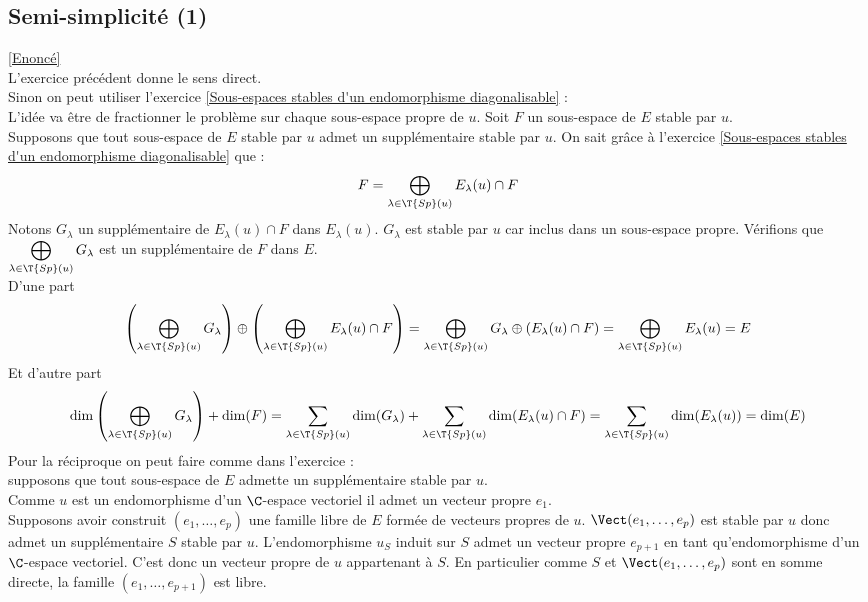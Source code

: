 \documentclass[8pt]{book}
\begin{document}
	\subsection{Semi-simplicité (1) }
	\label{Semi-simplicité (1) corrigé}
	\textcolor{blue}{\hyperref[Semi-simplicité (1)]{[Enoncé]}}\\
	L'exercice précédent donne le sens direct.\\
	Sinon on peut utiliser l'exercice \ref{Sous-espaces stables d'un endomorphisme diagonalisable} :\\
	L'idée va être de fractionner le problème sur chaque sous-espace propre de $u$. Soit $F$ un sous-espace de $E$ stable par $u$.\\
	Supposons que tout sous-espace de $E$ stable par $u$ admet un supplémentaire stable par $u$. On sait grâce à l'exercice \ref{Sous-espaces stables d'un endomorphisme diagonalisable} que :
	$$F=\bigoplus_{\lambda\in \T{Sp}(u)}E_\lambda(u)\cap F$$
	Notons $G_\lambda$ un supplémentaire de $E_\lambda(u)\cap F$ dans $E_\lambda(u)$. $G_\lambda$ est stable par $u$ car inclus dans un sous-espace propre. Vérifions que $\displaystyle\bigoplus_{\lambda\in \T{Sp}(u)}G_\lambda$ est un supplémentaire de $F$ dans $E$.\\
	D'une part $$\left(\bigoplus_{\lambda\in \T{Sp}(u)}G_\lambda\right)\oplus\left(\bigoplus_{\lambda\in \T{Sp}(u)}E_\lambda(u)\cap F\right)=\bigoplus_{\lambda\in \T{Sp}(u)}G_\lambda\oplus(E_\lambda(u)\cap F)=\bigoplus_{\lambda\in \T{Sp}(u)}E_\lambda(u)=E$$
	Et d'autre part $$\dim\left(\bigoplus_{\lambda\in \T{Sp}(u)}G_\lambda\right)+\dim(F)=\sum_{\lambda\in \T{Sp}(u)}\dim(G_\lambda)+\sum_{\lambda\in \T{Sp}(u)}\dim(E_\lambda(u)\cap F)=\sum_{\lambda\in \T{Sp}(u)}\dim(E_\lambda(u))=\dim(E)$$
	Pour la réciproque on peut faire comme dans l'exercice :\\
	supposons que tout sous-espace de $E$ admette un supplémentaire stable par $u$.\\
	Comme $u$ est un endomorphisme d'un $\C$-espace vectoriel il admet un vecteur propre $e_1$.\\
	Supposons avoir construit $(e_1,\dots,e_p)$ une famille libre de $E$ formée de vecteurs propres de $u$. $\Vect(e_1,\dots,e_p)$ est stable par $u$ donc admet un supplémentaire $S$ stable par $u$. L'endomorphisme $u_S$ induit sur $S$ admet un vecteur propre $e_{p+1}$ en tant qu'endomorphisme d'un $\C$-espace vectoriel. C'est donc un vecteur propre de $u$ appartenant à $S$. En particulier comme $S$ et $\Vect(e_1,\dots,e_p)$ sont en somme directe, la famille $(e_1,\dots,e_{p+1})$ est libre.\\
\end{document}
